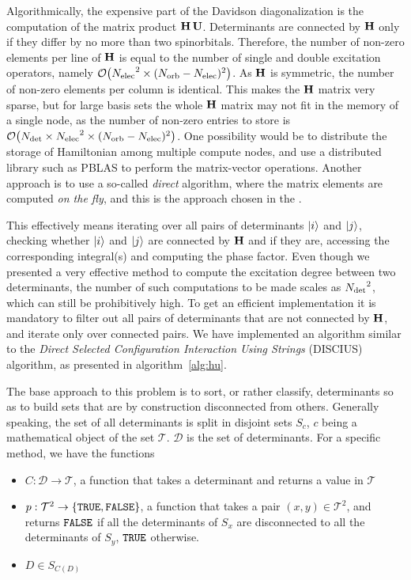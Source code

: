 \documentclass[./thesis.tex]{subfiles}
\begin{document}
    
Algorithmically, the expensive part of the Davidson diagonalization is the computation of the matrix product $\mathbf{H}\, \mathbf{U}$.
Determinants are connected by $\mathbf{H}$ only if they differ by no more than two
spinorbitals. Therefore, the number of non-zero elements per line of $\mathbf{H}$ is
equal to the number of single and double excitation operators, namely
$\order{\Nelec^2 \times (\Norb - \Nelec)^2}$. As $\mathbf{H}$ is symmetric, the number
of non-zero elements per column is identical. This makes the $\mathbf{H}$ matrix very
sparse, but for large basis sets the whole $\mathbf{H}$ matrix may not fit in the
memory of a single node, as the number of non-zero entries to store is
$\order{\Ndet \times \Nelec^2 \times (\Norb - \Nelec)^2}$.  One possibility
would be to distribute the storage of Hamiltonian among multiple compute nodes,
and use a distributed library such as PBLAS\cite{pblas} to perform the
matrix-vector operations. Another approach is to use a so-called \emph{direct}
algorithm, where the matrix elements are computed \emph{on the fly}, and this
is the approach chosen in the \QP.


This effectively means iterating over all pairs of determinants ${\ket{i}}$ and
${\ket{j}}$, checking whether ${\ket{i}}$ and ${\ket{j}}$ are connected by $\mathbf{H}$ and if they are,
accessing the corresponding integral(s) and computing the phase factor.  Even
though we presented a very effective method to compute the excitation degree
between two determinants, the number of such computations to be made scales as
${N_\text{det}}^2$, which can still be prohibitively high. To get an efficient
implementation it is mandatory to filter out all pairs of determinants that are
not connected by $\mathbf{H}$, and iterate only over connected pairs.  We have
implemented an algorithm similar to the \emph{Direct Selected Configuration
Interaction Using Strings} (DISCIUS) algorithm,\cite{Povill_1995} as presented
in algorithm~\ref{alg:hu}.




The base approach to this problem is to sort, or rather classify, determinants so as to build sets that are by construction disconnected from others. Generally speaking, the set of all determinants is split in disjoint sets $S_c$, $c$ being a mathematical object of the set $\mathcal{T}$. $\mathcal{D}$ is the set of determinants. For a specific method, we have the functions
\begin{itemize}
	\item
	$C : \mathcal{D} \rightarrow \mathcal{T}$, a function that takes a determinant and returns a value in $\mathcal{T}$
	\item
	$p : \mathcal{T}^2 \rightarrow \{ {\text{\texttt{TRUE}}}, {\text{\texttt{FALSE}}} \}$, a function that takes a pair $(x,y) \in \mathcal{T}^2$, and returns ${\text{\texttt{FALSE}}}$ if all the determinants of $S_x$ are disconnected to all the determinants of $S_y$, ${\text{\texttt{TRUE}}}$ otherwise.
	\item
	$D \in S_{C(D)}$
\end{itemize}  
\end{document}
